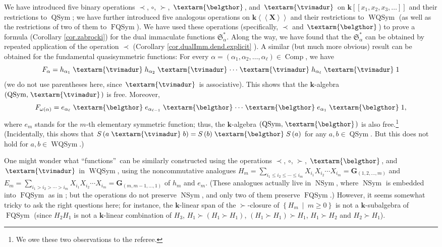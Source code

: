 \documentclass
[numbers=enddot,12pt,final,onecolumn,notitlepage,abstracton]{scrartcl}%
\theoremstyle{definition}
\newcommand{\tvi}{\left. \textarm{\tvimadur} \right.}
\newcommand{\bel}{\left. \textarm{\belgthor} \right.}
\let\sumnonlimits\sum
\renewcommand{\sum}{\sumnonlimits\limits}
\begin{document}
We have introduced five binary operations $\left.  \prec\right.  $, $\circ$,
$\left.  \succ\right.  $, $\bel $, and $\tvi $ on $\mathbf{k}\left[  \left[
x_{1},x_{2},x_{3},\ldots\right]  \right]  $ and their restrictions to
$\operatorname*{QSym}$; we have further introduced five analogous operations
on $\mathbf{k}\left\langle \left\langle \mathbf{X}\right\rangle \right\rangle
$ and their restrictions to $\operatorname*{WQSym}$ (as well as the
restrictions of two of them to $\operatorname*{FQSym}$). We have used these
operations (specifically, $\left.  \prec\right.  $ and $\bel $) to prove a
formula (Corollary \ref{cor.zabrocki}) for the dual immaculate functions
$\mathfrak{S}_{\alpha}^{\ast}$. Along the way, we have found that the
$\mathfrak{S}_{\alpha}^{\ast}$ can be obtained by repeated application of the
operation $\left.  \prec\right.  $ (Corollary \ref{cor.dualImm.dend.explicit}%
). A similar (but much more obvious) result can be obtained for the
fundamental quasisymmetric functions: For every $\alpha=\left(  \alpha
_{1},\alpha_{2},\ldots,\alpha_{\ell}\right)  \in\operatorname*{Comp}$, we have%
\[
F_{\alpha}=h_{\alpha_{1}} \tvi h_{\alpha_{2}} \tvi \cdots\tvi h_{\alpha_{\ell
}} \tvi 1
\]
(we do not use parentheses here, since $\tvi $ is associative). This shows
that the $\mathbf{k}$-algebra $\left(  \operatorname*{QSym}, \tvi \right)  $
is free. Moreover,%
\[
F_{\omega\left(  \alpha\right)  }=e_{\alpha_{\ell}} \bel e_{\alpha_{\ell-1}}
\bel \cdots\bel e_{\alpha_{1}} \bel 1,
\]
where $e_{m}$ stands for the $m$-th elementary symmetric function; thus, the
$\mathbf{k}$-algebra $\left(  \operatorname*{QSym}, \bel \right)  $ is also
free.\footnote{We owe these two observations to the referee.} (Incidentally,
this shows that $S\left(  a \tvi b\right)  =S\left(  b\right)  \bel S\left(
a\right)  $ for any $a,b\in\operatorname*{QSym}$. But this does not hold for
$a,b\in\operatorname*{WQSym}$.)

One might wonder what \textquotedblleft functions\textquotedblright\ can be
similarly constructed using the operations $\left.  \prec\right.  $, $\circ$,
$\left.  \succ\right.  $, $\bel $, and $\tvi $ in $\operatorname*{WQSym}$,
using the noncommutative analogues $H_{m}=\sum_{i_{1}\leq i_{2}\leq\cdots\leq
i_{m}}X_{i_{1}}X_{i_{2}}\cdots X_{i_{m}}=\mathbf{G}_{\left(  1,2,\ldots
,m\right)  }$ and $E_{m}=\sum_{i_{1}>i_{2}>\cdots>i_{m}}X_{i_{1}}X_{i_{2}%
}\cdots X_{i_{m}}=\mathbf{G}_{\left(  m,m-1,\ldots,1\right)  }$ of $h_{m}$ and
$e_{m}$. (These analogues actually live in $\operatorname*{NSym}$, where
$\operatorname*{NSym}$ is embedded into $\operatorname*{FQSym}$ as in
\cite[Corollary 8.1.14(b)]{Reiner}; but the operations do not preserve
$\operatorname*{NSym}$, and only two of them preserve $\operatorname*{FQSym}%
$.) However, it seems somewhat tricky to ask the right questions here; for
instance, the $\mathbf{k}$-linear span of the $\left.  \succ\right.  $-closure
of $\left\{  H_{m}\ \mid\ m\geq0\right\}  $ is not a $\mathbf{k}$-subalgebra
of $\operatorname*{FQSym}$ (since $H_{2}H_{1}$ is not a $\mathbf{k}$-linear
combination of $H_{3}$, $H_{1}\left.  \succ\right.  \left(  H_{1}\left.
\succ\right.  H_{1}\right)  $, $\left(  H_{1}\left.  \succ\right.
H_{1}\right)  \left.  \succ\right.  H_{1}$, $H_{1}\left.  \succ\right.  H_{2}$
and $H_{2}\left.  \succ\right.  H_{1}$).
\end{document}
